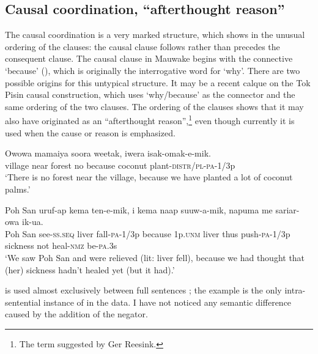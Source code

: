 \subsection{Causal coordination, ``afterthought reason''}

The causal coordination is a very marked structure, which shows in the unusual ordering of the clauses: the causal clause follows rather than precedes the consequent clause. The causal clause in Mauwake begins with the connective  `because' (), which is originally the interrogative word for `why'.  There are two possible origins for this untypical structure. It may be a recent calque on the Tok Pisin causal construction, which uses  `why/because' as the connector and the same ordering of the two clauses. The ordering of the clauses shows that it may also have originated as an ``afterthought reason'',\footnote{The term suggested by Ger Reesink.} even though  currently it is used when the cause or reason is emphasized. 

\ea%
\label{ex:8:x1417}
\gll Owowa  mamaiya  soora  weetak,    iwera isak-omak-e-mik.\\
village  near  forest  no  because  coconut plant-\textsc{distr}/\textsc{pl}-\textsc{pa}-1/3p\\
\glt`There is no forest near the village, because we have planted a lot of coconut palms.'
\z


\ea%
\label{ex:8:x1420}
\gll Poh  San  uruf-ap  kema  ten-e-mik,    i  kema naap  suuw-a-mik,  napuma  me  sariar-owa  ik-ua.\\
Poh  San  see-\textsc{ss}.\textsc{seq} liver fall-\textsc{pa}-1/3p  because 1p.\textsc{unm} liver thus  push-\textsc{pa}-1/3p sickness  not heal-\textsc{nmz} be-\textsc{pa}.3s\\
\glt`We saw Poh San and were relieved (lit: liver fell), because we had thought that (her) sickness hadn't healed yet (but it had).'
\z


 is used almost exclusively between full sentences ; the example  is the only intra-sentential instance of  in the data. I have not noticed any semantic difference caused by the addition of the negator.

